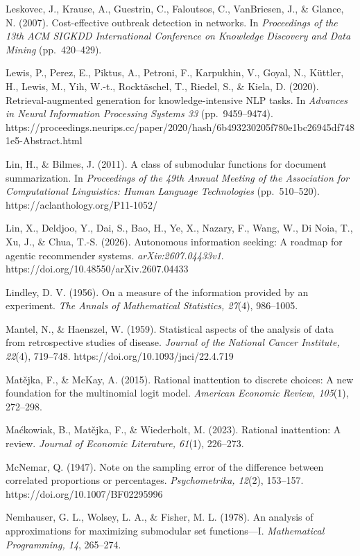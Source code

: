 \documentclass[
  11pt]{article}
\begin{document}
Leskovec, J., Krause, A., Guestrin, C., Faloutsos, C., VanBriesen, J.,
\& Glance, N. (2007). Cost-effective outbreak detection in networks. In
\emph{Proceedings of the 13th ACM SIGKDD International Conference on
Knowledge Discovery and Data Mining} (pp.~420--429).

Lewis, P., Perez, E., Piktus, A., Petroni, F., Karpukhin, V., Goyal, N.,
Küttler, H., Lewis, M., Yih, W.-t., Rocktäschel, T., Riedel, S., \&
Kiela, D. (2020). Retrieval-augmented generation for knowledge-intensive
NLP tasks. In \emph{Advances in Neural Information Processing Systems
33} (pp.~9459--9474).
https://proceedings.neurips.cc/paper/2020/hash/6b493230205f780e1bc26945df7481e5-Abstract.html

Lin, H., \& Bilmes, J. (2011). A class of submodular functions for
document summarization. In \emph{Proceedings of the 49th Annual Meeting
of the Association for Computational Linguistics: Human Language
Technologies} (pp.~510--520). https://aclanthology.org/P11-1052/

Lin, X., Deldjoo, Y., Dai, S., Bao, H., Ye, X., Nazary, F., Wang, W., Di
Noia, T., Xu, J., \& Chua, T.-S. (2026). Autonomous information seeking:
A roadmap for agentic recommender systems. \emph{arXiv:2607.04433v1}.
https://doi.org/10.48550/arXiv.2607.04433

Lindley, D. V. (1956). On a measure of the information provided by an
experiment. \emph{The Annals of Mathematical Statistics, 27}(4),
986--1005.

Mantel, N., \& Haenszel, W. (1959). Statistical aspects of the analysis
of data from retrospective studies of disease. \emph{Journal of the
National Cancer Institute, 22}(4), 719--748.
https://doi.org/10.1093/jnci/22.4.719

Matějka, F., \& McKay, A. (2015). Rational inattention to discrete
choices: A new foundation for the multinomial logit model.
\emph{American Economic Review, 105}(1), 272--298.

Maćkowiak, B., Matějka, F., \& Wiederholt, M. (2023). Rational
inattention: A review. \emph{Journal of Economic Literature, 61}(1),
226--273.

McNemar, Q. (1947). Note on the sampling error of the difference between
correlated proportions or percentages. \emph{Psychometrika, 12}(2),
153--157. https://doi.org/10.1007/BF02295996

Nemhauser, G. L., Wolsey, L. A., \& Fisher, M. L. (1978). An analysis of
approximations for maximizing submodular set functions---I.
\emph{Mathematical Programming, 14}, 265--274.
\end{document}

